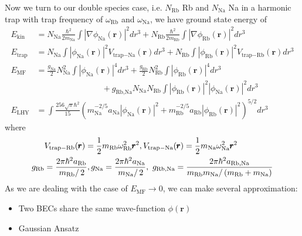 Now we turn to our double species case, i.e. $N_{\text{Rb}}$ Rb and $N_{\text{Na}}$ Na in a harmonic trap with trap frequency of $\omega_{\text{Rb}}$ and $\omega _{\text{Na}}$, we have ground state energy of
\begin{equation}
\begin{split}
E_{\text{kin}}&=N_{\text{Na}}\frac{\hbar^2}{2m_{\text{Na}}}\int \left| \nabla \phi _{\text{Na}}(\pmb{r})\right|^2dr^3+N_{\text{Rb}}\frac{\hbar ^2}{2m_{\text{Rb}}}\int\left|\nabla\phi_{\text{Rb}}(\pmb{r})\right|^2dr^3\\
E_{\text{trap}}&=N_{\text{Na}}\int\left|\phi_{\text{Na}}(\pmb{r})\right|^2V_{\text{trap}-\text{Na}}(\pmb{r})dr^3+N_{\text{Rb}}\int\left|\phi _{\text{Rb}}(\pmb{r})\right|^2V_{\text{trap}-\text{Rb}}(\pmb{r})dr^3\\
E_{\text{MF}}&=\frac{g_{\text{Na}}}{2}N_{\text{Na}}^2\int\left|\phi_{\text{Na}}(\pmb{r})\right|^4dr^3+\frac{g_{\text{Rb}}}{2}N_{\text{Rb}}^2\int\left|\phi_{\text{Rb}}(\pmb{r})\right|^4dr^3\\
&\qquad\qquad\qquad\qquad+g_{\text{Rb},\text{Na}}N_{\text{Na}}N_{\text{Rb}}\int\left|\phi_{\text{Rb}}(\pmb{r})\right|^2\left|\phi_{\text{Na}}(\pmb{r})\right|^2dr^3\\
E_{\text{LHY}}&=\int\frac{256\sqrt{\pi}\hbar^2}{15}\left(m_{\text{Na}}^{-2/5}a_{\text{Na}}\left|\phi_{\text{Na}}(\pmb{r})\right|^2+m_{\text{Rb}}^{-2/5}a_{\text{Rb}}\left|\phi_{\text{Rb}}(\pmb{r})\right|^2\right)^{5/2}dr^3
\end{split}
\end{equation}
where
\begin{equation}
\begin{split}
&V_{\text{trap}-\text{Rb}}(\pmb{r})=\frac{1}{2}m_{\text{Rb}}\omega _{\text{Rb}}^2\pmb{r}^2,V_{\text{trap}-\text{Na}}(\pmb{r})=\frac{1}{2}m_{\text{Na}} \omega _{\text{Na}}^2\pmb{r}^2\\
g_{\text{Rb}}&=\frac{2\pi\hbar^2a_{\text{Rb}}}{\left.m_{\text{Rb}}\right/2},\text{}g_{\text{Na}}=\frac{2\pi\hbar^2a_{\text{Na}}}{\left.m_{\text{Na}}\right/2},\text{     }g_{\text{Rb},\text{Na}}=\frac{2\pi  \hbar ^2a_{\text{Rb},\text{Na}}}{m_{\text{Rb}}m_{\text{Na}}/\left(m_{\text{Rb}}+m_{\text{Na}}\right)}\\
\end{split}    
\end{equation}
As we are dealing with the case of $E_{\text{MF}}\to 0$, we can make several approximation:
\begin{itemize}[noitemsep,topsep=0pt]
    \item Two BECs share the same wave-function $\phi (\pmb{r})$
    \item Gaussian Ansatz
\end{itemize}
